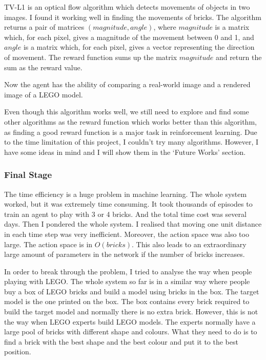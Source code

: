 \documentclass[a4paper]{article}
\begin{document}
        		TV-L1 is an optical flow algorithm which detects movements of objects in two images. I found it working well in finding the movements of bricks. The algorithm returns a pair of matrices $(magnitude, angle)$, where $magnitude$ is a matrix which, for each pixel, gives a magnitude of the movement between 0 and 1, and $angle$ is a matrix which, for each pixel, gives a vector representing the direction of movement. The reward function sums up the matrix $magnitude$ and return the sum as the reward value. 
        		
        		Now the agent has the ability of comparing a real-world image and a rendered image of a LEGO model. 
        		
        		Even though this algorithm works well, we still need to explore and find some other algorithms as the reward function which works better than this algorithm, as finding a good reward function is a major task in reinforcement learning. Due to the time limitation of this project, I couldn't try many algorithms. However, I have some ideas in mind and I will show them in the `Future Works' section. 
        		
        	\subsubsection{Final Stage}
        		The time efficiency is a huge problem in machine learning. The whole system worked, but it was extremely time consuming. It took thousands of episodes to train an agent to play with 3 or 4 bricks. And the total time cost was several days. Then I pondered the whole system. I realised that moving one unit distance in each time step was very inefficient. Moreover, the action space was also too large. The action space is in $O(bricks)$. This also leads to an extraordinary large amount of parameters in the network if the number of bricks increases. 
        		
        		In order to break through the problem, I tried to analyse the way when people playing with LEGO. The whole system so far is in a similar way where people buy a box of LEGO bricks and build a model using bricks in the box. The target model is the one printed on the box. The box contains every brick required to build the target model and normally there is no extra brick. However, this is not the way when LEGO experts build LEGO models. The experts normally have a large pool of bricks with different shape and colours. What they need to do is to find a brick with the best shape and the best colour and put it to the best position. 
        		
\end{document}
